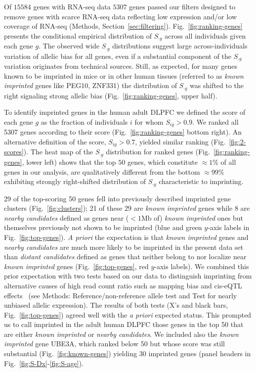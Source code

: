 \documentclass[letterpaper]{article}
\begin{document}
Of \(15584\) genes with RNA-seq data \(5307\) genes passed our filters designed to remove genes with
scarce RNA-seq data reflecting low expression and/or low coverage of
RNA-seq (Methods, Section~\ref{sec:filtering}).
Fig.~\ref{fig:ranking-genes} presents the conditional empirical distribution
of \(S_{\cdot g}\) across all individuals given each gene \(g\).  The observed wide
\(S_{\cdot g}\) distributions suggest large across-individuals variation of allelic bias for all
genes, even if a substantial component of the \(S_{\cdot g}\) variation originates from technical sources.
Still, as expected, for many genes known to be imprinted in mice or in other human tissues
(referred to as \emph{known imprinted} genes like PEG10, ZNF331) the distribution of \(S_{\cdot g}\) was shifted
to the right signaling strong allelic bias (Fig.~\ref{fig:ranking-genes}, upper
half).

To identify imprinted genes in the human adult DLPFC we defined the score of
each gene \(g\) as the fraction of individuals \(i\) for whom \(S_{ig}>0.9\).
We ranked all 5307 genes according to their score
(Fig.~\ref{fig:ranking-genes} bottom right).  An alternative definition of the
score, \(S_{ig}>0.7\), yielded similar ranking (Fig.~\ref{fig:2-scores}). The
heat map of the \(S_{\cdot g}\) distribution for ranked genes
(Fig.~\ref{fig:ranking-genes}, lower left) shows that the top \(50\) genes,
which constitute \(\approx 1\%\) of all genes in our analysis, are
qualitatively different from the bottom \(\approx 99\%\) exhibiting strongly
right-shifted distribution of \(S_{\cdot g}\) characteristic to imprinting.

29 of the top-scoring 50 genes fell into previously described imprinted gene
clusters (Fig.~\ref{fig:clusters}); 21 of these 29 are \emph{known imprinted}
genes while 8 are \emph{nearby candidates} defined as genes near
(\(<1\mathrm{Mb}\) of) \emph{known imprinted} ones but themselves previously
not shown to be imprinted (blue and green \(y\)-axis labels in
Fig.~\ref{fig:top-genes}).   \emph{A priori} the expectation is that
\emph{known imprinted} genes and \emph{nearby candidates} are much more likely
to be imprinted  in the present data set than \emph{distant candidates}
defined as genes that neither belong to nor localize near \emph{known
imprinted} genes (Fig.~\ref{fig:top-genes}, red \(y\)-axis labels).  We
combined this prior expectation with two tests based on our data to
distinguish imprinting from alternative causes of high read count ratio such
as mapping bias and cis-eQTL effects~\cite{Babak2015} (see Methods:
Reference/non-reference allele test and Test for nearly unbiased allelic
expression).  The results of both tests (X's and black bars,
Fig.~\ref{fig:top-genes}) agreed well with the \emph{a priori} expected
status.  This prompted us to call imprinted in the adult human DLPFC those
genes in the top 50 that are either
\emph{known imprinted} or \emph{nearby candidates}.
We included also the \emph{known imprinted} gene UBE3A, which ranked below 50
but whose score was still substantial (Fig.~\ref{fig:known-genes}) yielding 30
imprinted genes (panel headers in Fig.~\ref{fig:S-Dx}-\ref{fig:S-age}).
\end{document}
